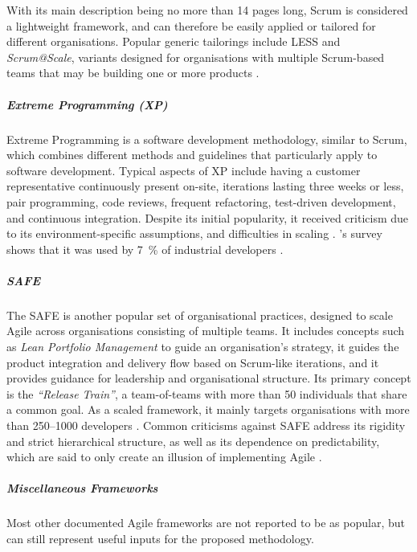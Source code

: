 \documentclass[a4paper,nobib,justified,final]{tufte-book}
\begin{document}
With its main description being no more than 14 pages long, Scrum is considered a lightweight framework, and can therefore be easily applied or tailored for different organisations. Popular generic tailorings include \acf{LESS} and \emph{Scrum@Scale}, variants designed for organisations with multiple Scrum-based teams that may be building one or more products \autocite{larmanLargescaleScrumMore2017,ReadScrumScaleGuide}.

\subparagraph{Extreme Programming (XP)}
Extreme Programming is a software development methodology, similar to Scrum, which combines different methods and guidelines that particularly apply to software development.
Typical aspects of XP include having a customer representative continuously present on-site, iterations lasting three weeks or less, pair programming, code reviews, frequent refactoring, test-driven development, and continuous integration. Despite its initial popularity, it received criticism due to its environment-specific assumptions, and difficulties in scaling \autocite{boehmBalancingAgilityDiscipline2004}. \citeauthor{atzbergerAgileDevelopmentPhysical2020}'s survey shows that it was used by \qty{7}{\percent} of industrial developers \autocite{atzbergerAgileDevelopmentPhysical2020}.

\subparagraph[SAFe (Scaled Agile Framework)]{\acf{SAFE}}

The \acl{SAFE} is another popular set of organisational practices, designed to scale Agile across organisations consisting of multiple teams. It includes concepts such as \emph{Lean Portfolio Management} to guide an organisation's strategy, it guides the product integration and delivery flow based on Scrum-like iterations, and it provides guidance for leadership and organisational structure. Its primary concept is the \emph{``Release Train''}, a team-of-teams with more than 50 individuals that share a common goal. As a scaled framework, it mainly targets organisations with more than 250--1000 developers \autocite{heusserIntroducingScaledAgile2015}. Common criticisms against \acl{SAFE} address its rigidity and strict hierarchical structure, as well as its dependence on predictability, which are said to only create an illusion of implementing Agile \autocite{schwaberUnsafeAnySpeed2013}.

\subparagraph{Miscellaneous Frameworks}
Most other documented Agile frameworks are not reported to be as popular, but can still represent useful inputs for the proposed methodology.
\end{document}
